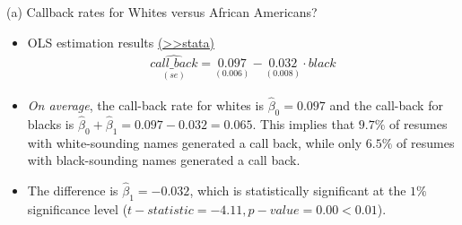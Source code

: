 \documentclass[
  10pt,
  ignorenonframetext,
]{beamer}
\providecommand{\tightlist}{%
  \setlength{\itemsep}{0pt}\setlength{\parskip}{0pt}}
\begin{document}
\begin{frame}{(a) Callback rates for Whites versus African Americans?}
\protect\hypertarget{a-callback-rates-for-whites-versus-african-americans-1}{}
\begin{itemize}
\item
  OLS estimation results
  \footnotesize \protect\hyperlink{res1-regBlack}{(\textgreater\textgreater stata)}
  \normalsize \[
  \begin{aligned}
  \underset{(se)}{\widehat{call\_back}} = \underset{(0.006)}{0.097} - \underset{(0.008)}{0.032}\cdot black
  \end{aligned}
  \]
\item
  \emph{On average}, the call-back rate for whites is
  \(\hat{\beta}_0 = 0.097\) and the call-back for blacks is
  \(\hat{\beta}_0 + \hat{\beta}_1 = 0.097 - 0.032 = 0.065\). This
  implies that \(9.7\%\) of resumes with white-sounding names generated
  a call back, while only \(6.5\%\) of resumes with black-sounding names
  generated a call back.
\end{itemize}

\vspace{0.8mm}

\begin{itemize}
\tightlist
\item
  The difference is \(\hat{\beta}_1 = -0.032\), which is statistically
  significant at the \(1\%\) significance level
  (\(t-statistic = -4.11, p-value = 0.00<0.01\)).
\end{itemize}
\end{frame}
\end{document}

